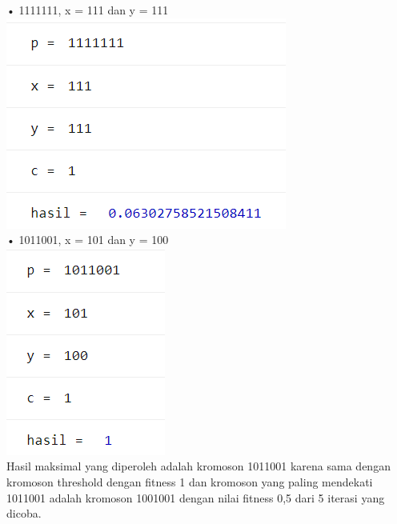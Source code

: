 \documentclass[12pt]{article}
\begin{document}
\begin{enumerate}[label=(\alph*)]
  	•	1111111, x = 111 dan y = 111\\
  	  	\includegraphics[scale=1]{UASFiskom0408.png}\\
  	•	1011001, x = 101 dan y = 100\\
	  	\includegraphics[scale=1]{UASFiskom0409.png}\\
  	
  	Hasil maksimal yang diperoleh adalah kromoson 1011001 karena sama dengan kromoson threshold dengan fitness 1 dan kromoson yang paling mendekati 1011001 adalah kromoson 1001001 dengan nilai fitness 0,5 dari 5 iterasi yang dicoba.
  	
	\end{enumerate}
\end{document}
